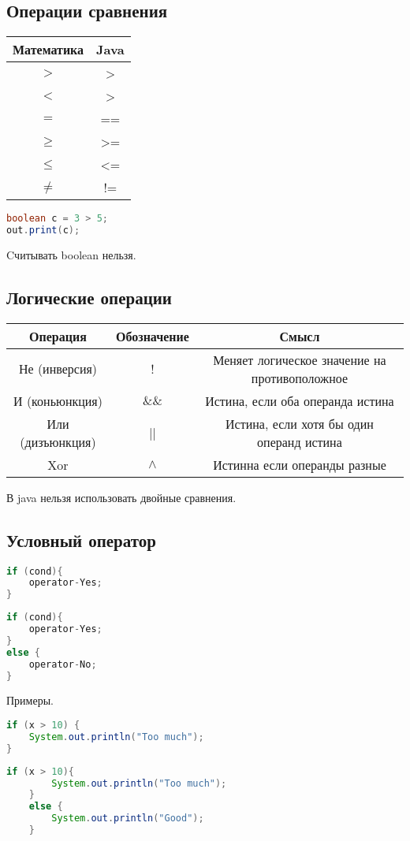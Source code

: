 \documentclass{article}
\begin{document}
\subsection{Операции сравнения}
\begin{tabular}
	{c | c}
	Математика & Java \\
	\hline
	$>$        & >    \\
	$<$        & >    \\
	$=$        & ==   \\
	$\ge $     & >=   \\
	$\le $     & <=   \\
	$\neq$     & !=   \\
\end{tabular}
\begin{lstlisting}[language=Java] 
boolean c = 3 > 5;
out.print(c);
\end{lstlisting}
Cчитывать boolean нельзя.
\subsection{Логические операции}
\begin{tabular}
	{|c | c | c |}
	\hline
	Операция         & Обозначение & Смысл                                         \\
	\hline
	Не (инверсия)    & !           & Меняет логическое значение на противоположное \\
	\hline
	И (коньюнкция)   & $\&\&$      & Истина, если оба операнда истина              \\
	\hline
	Или (дизъюнкция) & ||          & Истина, если хотя бы один операнд истина      \\
	\hline
	Xor              & $\land$     & Истинна если операнды разные                  \\
	\hline
\end{tabular}
В java нельзя использовать двойные сравнения.
\subsection{Условный оператор}
\begin{lstlisting}[language=Java] 
if (cond){
    operator-Yes;
} 
\end{lstlisting}
\begin{lstlisting}[language=Java] 
if (cond){
    operator-Yes;
}
else {
    operator-No;
}
\end{lstlisting}
Примеры.
\begin{lstlisting}[language=Java] 
if (x > 10) {
    System.out.println("Too much");
} 
\end{lstlisting}
\begin{lstlisting}[language=Java] 
    if (x > 10){
        System.out.println("Too much");
    } 
    else {
        System.out.println("Good");
    }
\end{lstlisting}
\end{document}
